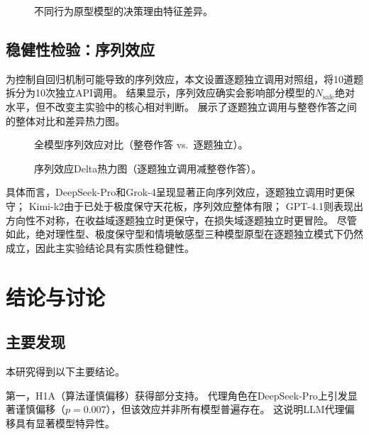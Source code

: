 \documentclass[journal]{vgtc}
\begin{document}
\begin{figure}[!htbp]
  \centering
  
  \caption{不同行为原型模型的决策理由特征差异。}
  \label{fig:text_models}
\end{figure}

\subsection{稳健性检验：序列效应}

为控制自回归机制可能导致的序列效应，本文设置逐题独立调用对照组，将10道题拆分为10次独立API调用。
结果显示，序列效应确实会影响部分模型的$N_{\text{safe}}$绝对水平，但不改变主实验中的核心相对判断。
展示了逐题独立调用与整卷作答之间的整体对比和差异热力图。

\begin{figure}[!htbp]
  \centering
  
  \caption{全模型序列效应对比（整卷作答 vs.\ 逐题独立）。}
  \label{fig:sequence_all_models}
\end{figure}

\begin{figure}[!htbp]
  \centering
  
  \caption{序列效应Delta热力图（逐题独立调用减整卷作答）。}
  \label{fig:sequence_heatmap}
\end{figure}

具体而言，DeepSeek-Pro和Grok-4呈现显著正向序列效应，逐题独立调用时更保守；
Kimi-k2由于已处于极度保守天花板，序列效应整体有限；
GPT-4.1则表现出方向性不对称，在收益域逐题独立时更保守，在损失域逐题独立时更冒险。
尽管如此，绝对理性型、极度保守型和情境敏感型三种模型原型在逐题独立模式下仍然成立，因此主实验结论具有实质性稳健性。

\clearpage

\section{结论与讨论}

\subsection{主要发现}

本研究得到以下主要结论。

第一，H1A（算法谨慎偏移）获得部分支持。
代理角色在DeepSeek-Pro上引发显著谨慎偏移（$p=0.007$），但该效应并非所有模型普遍存在。
这说明LLM代理偏移具有显著模型特异性。
\end{document}
